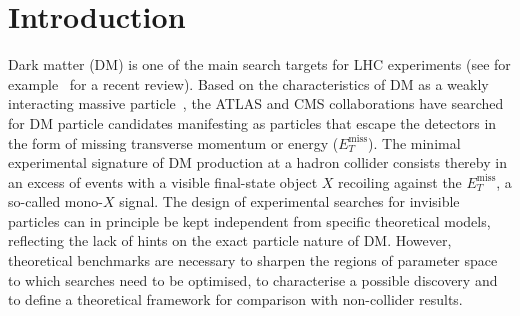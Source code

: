 \documentclass[a4paper, 11pt,notoc]{article}
\newcommand{\MET}{\ensuremath{E_T^\mathrm{miss}}\xspace}
\begin{document}
\maketitle


\section{Introduction}
\label{sec:introduction}

Dark matter (DM) is one of the main search targets for LHC experiments (see for example~\cite{Kahlhoefer:2017dnp} for a recent review). Based on the characteristics of DM as a weakly interacting massive particle~\cite{Bertone:2004pz}, the ATLAS and CMS collaborations have searched for DM particle candidates manifesting as particles that escape the detectors in the form of missing transverse momentum or energy ($\MET$). The minimal experimental signature of DM production at a hadron collider consists thereby in an excess of events with a visible final-state object $X$ recoiling against the $\MET$, a so-called mono-$X$ signal.  The design of experimental searches for invisible particles can in principle be kept independent from specific theoretical models, reflecting the lack of hints on the exact particle nature of DM. However, theoretical benchmarks are necessary to sharpen the regions of parameter space to which searches need to be optimised, to characterise a possible discovery and to define a theoretical framework for comparison with non-collider results. 
\end{document}
